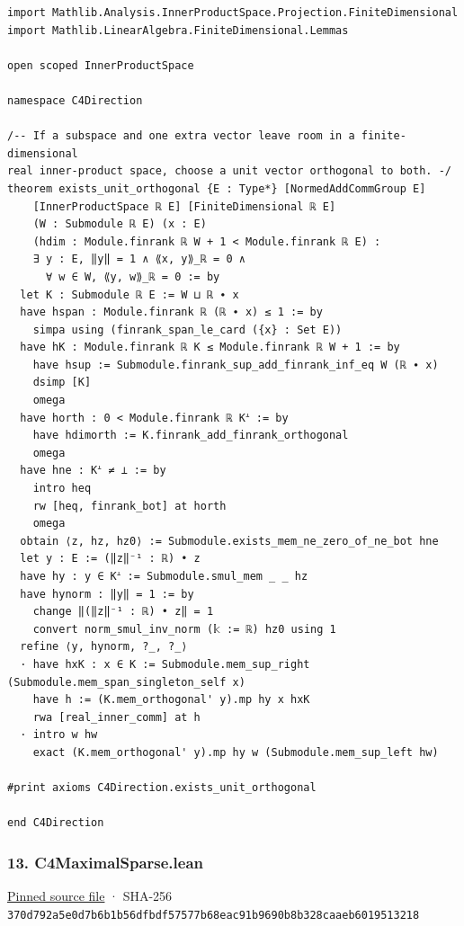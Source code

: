 \documentclass[11pt,a4paper]{article}
\begin{document}
\begin{Verbatim}[breaklines,breakanywhere,fontsize=\footnotesize]
import Mathlib.Analysis.InnerProductSpace.Projection.FiniteDimensional
import Mathlib.LinearAlgebra.FiniteDimensional.Lemmas

open scoped InnerProductSpace

namespace C4Direction

/-- If a subspace and one extra vector leave room in a finite-dimensional
real inner-product space, choose a unit vector orthogonal to both. -/
theorem exists_unit_orthogonal {E : Type*} [NormedAddCommGroup E]
    [InnerProductSpace ℝ E] [FiniteDimensional ℝ E]
    (W : Submodule ℝ E) (x : E)
    (hdim : Module.finrank ℝ W + 1 < Module.finrank ℝ E) :
    ∃ y : E, ‖y‖ = 1 ∧ ⟪x, y⟫_ℝ = 0 ∧
      ∀ w ∈ W, ⟪y, w⟫_ℝ = 0 := by
  let K : Submodule ℝ E := W ⊔ ℝ ∙ x
  have hspan : Module.finrank ℝ (ℝ ∙ x) ≤ 1 := by
    simpa using (finrank_span_le_card ({x} : Set E))
  have hK : Module.finrank ℝ K ≤ Module.finrank ℝ W + 1 := by
    have hsup := Submodule.finrank_sup_add_finrank_inf_eq W (ℝ ∙ x)
    dsimp [K]
    omega
  have horth : 0 < Module.finrank ℝ Kᗮ := by
    have hdimorth := K.finrank_add_finrank_orthogonal
    omega
  have hne : Kᗮ ≠ ⊥ := by
    intro heq
    rw [heq, finrank_bot] at horth
    omega
  obtain ⟨z, hz, hz0⟩ := Submodule.exists_mem_ne_zero_of_ne_bot hne
  let y : E := (‖z‖⁻¹ : ℝ) • z
  have hy : y ∈ Kᗮ := Submodule.smul_mem _ _ hz
  have hynorm : ‖y‖ = 1 := by
    change ‖(‖z‖⁻¹ : ℝ) • z‖ = 1
    convert norm_smul_inv_norm (𝕜 := ℝ) hz0 using 1
  refine ⟨y, hynorm, ?_, ?_⟩
  · have hxK : x ∈ K := Submodule.mem_sup_right (Submodule.mem_span_singleton_self x)
    have h := (K.mem_orthogonal' y).mp hy x hxK
    rwa [real_inner_comm] at h
  · intro w hw
    exact (K.mem_orthogonal' y).mp hy w (Submodule.mem_sup_left hw)

#print axioms C4Direction.exists_unit_orthogonal

end C4Direction
\end{Verbatim}

\subsubsection{13. C4MaximalSparse.lean}\label{c4maximalsparse.lean}

\href{https://github.com/mpelteshki/climbing-to-the-frontier/blob/29fbb70da18564048f62492e43870f2f96a65463/cagent/p1/C4MaximalSparse.lean}{Pinned source file} · SHA-256 \texttt{370d792a\allowbreak{}5e0d7b6b\allowbreak{}1b56dfbd\allowbreak{}f57577b6\allowbreak{}8eac91b9\allowbreak{}690b8b32\allowbreak{}8caaeb60\allowbreak{}19513218}
\end{document}
